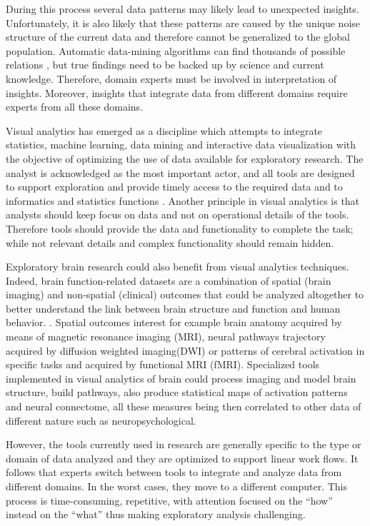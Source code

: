 \documentclass[utf8,paper]{frontiersSCNS} %
\begin{document}
During this process several data patterns may likely lead to unexpected insights. Unfortunately, it is also likely that these patterns are caused by the unique noise structure of the current data and therefore cannot be generalized to the global population. Automatic data-mining algorithms can find thousands of possible relations , but true findings need to be backed up by science and current knowledge.  Therefore, domain experts must be involved in interpretation of insights. Moreover, insights that integrate data from different domains require experts from all these domains.

Visual analytics \citep{keim_visual_2008} has emerged as a discipline which attempts to integrate statistics, machine learning, data mining and interactive data visualization with the objective of optimizing the use of data available for exploratory research. The analyst is acknowledged as the most important actor, and all tools are designed to support exploration and provide timely access to the required data and to informatics and statistics functions . Another principle in visual analytics is that analysts should keep focus on data and not on operational details of the tools. Therefore tools should provide the data and functionality to complete the task; while not relevant details and complex functionality should remain hidden. 
					
Exploratory brain research  could also benefit from visual analytics techniques. Indeed, brain function-related datasets are a combination of spatial (brain imaging) and non-spatial (clinical) outcomes that could be analyzed altogether to better understand the link between brain structure and function and human behavior. . Spatial outcomes interest for example brain anatomy acquired by means of magnetic resonance imaging (MRI), neural pathways trajectory acquired by diffusion weighted imaging(DWI) or patterns of cerebral activation in specific tasks and acquired by functional MRI (fMRI). Specialized tools implemented in visual analytics of brain could process imaging and model brain structure, build pathways, also produce statistical maps of activation patterns and neural connectome, all these measures being then correlated to other data of different nature such as neuropsychological.

However, the tools currently used in research are generally specific to the type or domain of data analyzed and they are optimized to support linear work flows. It follows that experts switch between tools to integrate and analyze data from different domains. In the worst cases, they move to a different computer. This process is time-consuming, repetitive, with attention focused on the ``how'' instead on the ``what'' thus making exploratory analysis challenging.
\end{document}

